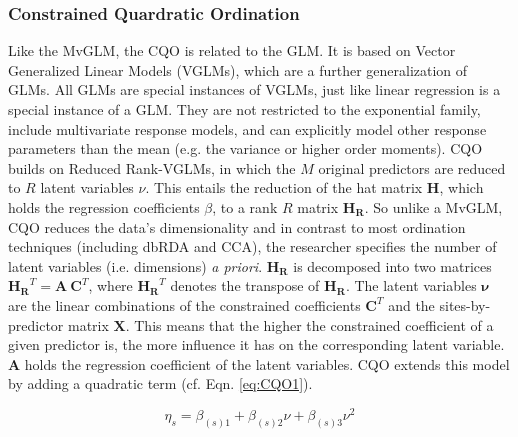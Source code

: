 \documentclass[a4paper,11pt]{article}
\begin{document}
        \subsubsection*{Constrained Quardratic Ordination}
	    Like the MvGLM, the CQO is related to the GLM. 
		It is based on Vector Generalized Linear Models (VGLMs), which are a further generalization of GLMs.
		All GLMs are special instances of VGLMs, just like linear regression is a special instance of a GLM.
		They are not restricted to the exponential family, include multivariate response models, and can explicitly model other response parameters than the mean (e.g. the variance or higher order moments).
        CQO builds on Reduced Rank-VGLMs, in which the $M$ original predictors are reduced to $R$ latent variables $\nu$. 
		This entails the reduction of the hat matrix $\mathbf{H}$, which holds the regression coefficients $\beta$, to a rank $R$ matrix $\mathbf{H_R}$.
		So unlike a MvGLM, CQO reduces the data's dimensionality and in contrast to most ordination techniques (including dbRDA and CCA), the researcher specifies the number of latent variables (i.e. dimensions)  \textit{a priori}.
		$\mathbf{H_R}$ is decomposed into two matrices $\mathbf{H_R}^T = \mathbf{A}\ \mathbf{C}^T$, where $\mathbf{H_R}^T$ denotes the transpose of $\mathbf{H_R}$.  
		The latent variables $\mathbf{\nu}$ are the linear combinations of the constrained coefficients $\mathbf{C}^T$ and the sites-by-predictor matrix $\mathbf{X}$.
		This means that the higher the constrained coefficient of a given predictor is, the more influence it has on the corresponding latent variable.   
		$\mathbf{A}$ holds the regression coefficient of the latent variables.
		CQO extends this model by adding a quadratic term (cf. Eqn. \ref{eq:CQO1}). 
	
		\begin{equation}\label{eq:CQO1} 
		\eta_s = \beta_{(s)1} + \beta_{(s)2} \nu + \beta_{(s)3} \nu^2	
		\end{equation} 
		
\end{document}
